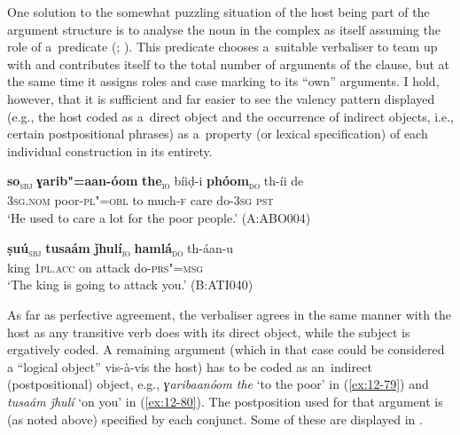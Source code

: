 One solution to the somewhat puzzling situation of the host being part of the argument structure is to analyse the noun in the complex as itself assuming the role of a~predicate (\citealt[204--212]{verma1993}; \citealt[164--170]{mohanan1993}). This predicate chooses a~suitable verbaliser to team up with and contributes itself to the total number of arguments of the clause, but at the same time it assigns roles and case marking to its ``own'' arguments. I hold, however, that it is sufficient and far easier to see the valency pattern displayed (e.g., the host coded as a~direct object and the occurrence of indirect objects, i.e., certain postpositional phrases) as a~property (or lexical specification) of each individual construction in its entirety. 

\begin{exe}
\ex
\label{ex:12-79}
\gll {\ob}\textbf{so}{\cb}\textsubscript{\textsc{\upshape sbj}} {\ob}\textbf{ɣarib"=aan-óom} \textbf{the}{\cb}\textsubscript{\textsc{\upshape io}} bíiḍ-i {\ob}\textbf{phóom}{\cb}\textsubscript{\textsc{\upshape do}} th-íi de\\
\textsc{3sg.nom} poor-\textsc{pl"=obl} to much-\textsc{f} care do-\textsc{3sg}  \textsc{pst} \\
\glt `He used to care a lot for the poor people.' (A:ABO004)
\end{exe}
\begin{exe}
\ex
\label{ex:12-80}
\gll {\ob}\textbf{ṣuú}{\cb}\textsubscript{\textsc{\upshape sbj}} {\ob}\textbf{tusaám} \textbf{ǰhulí}{\cb}\textsubscript{\textsc{\upshape io}} {\ob}\textbf{hamlá}{\cb}\textsubscript{\textsc{\upshape do}} th-áan-u\\
king \textsc{1pl.acc} on attack do-\textsc{prs"=msg}\\
\glt `The king is going to attack you.' (B:ATI040)
\end{exe}

As far as perfective agreement, the verbaliser agrees in the same manner with the host as any transitive verb does with its direct object, while the subject is ergatively coded. A remaining argument (which in that case could be considered a ``logical object'' vis-à-vis the host) has to be coded as an~indirect (postpositional) object, e.g., \textit{ɣaribaanóom the} `to the poor' in (\ref{ex:12-79}) and \textit{tusaám ǰhulí} `on you' in (\ref{ex:12-80}). The postposition used for that argument is (as noted above) specified by each conjunct. Some of these are displayed in .



